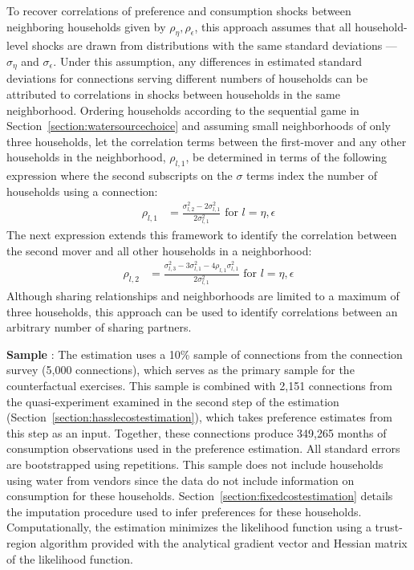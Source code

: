 \documentclass[12pt]{article}
\begin{document}
To recover correlations of preference and consumption shocks between neighboring households given by $\rho_{\eta}, \rho_{\epsilon}$, this approach assumes that all household-level shocks are drawn from distributions with the same standard deviations --- $\sigma_{\eta}$ and $\sigma_{\epsilon}$.  Under this assumption, any differences in estimated standard deviations for connections serving different numbers of households can be attributed to correlations in shocks between households in the same neighborhood.  Ordering households according to the sequential game in Section~\ref{section:watersourcechoice} and assuming small neighborhoods of only three households, let the correlation terms between the first-mover and any other households in the neighborhood, $\rho_{l,1}$, be determined in terms of the following expression where the second subscripts on the $\sigma$ terms index the number of households using a connection:
\begin{align*}
\rho_{l,1} &= \frac{\sigma_{l,2}^2 - 2\sigma_{l,1}^2}{2\sigma_{l,1}^2} \text{ for } l =  \eta, \epsilon 
\end{align*}
The next expression extends this framework to identify the correlation between the second mover and all other households in a neighborhood:
\begin{align*}
\rho_{l,2} &= \frac{\sigma_{l,3}^2 - 3\sigma_{l,1}^2- 4 \rho_{l,1} \sigma_{l,1}^2 }{2\sigma_{l,1}^2 } \text{ for } l =  \eta, \epsilon
\end{align*}
Although sharing relationships and neighborhoods are limited to a maximum of three households, this approach can be used to identify correlations between an arbitrary number of sharing partners.

\textbf{Sample} : The estimation uses a 10\% sample of connections from the connection survey (5,000 connections), which serves as the primary sample for the counterfactual exercises.  This sample is combined with 2,151 connections from the quasi-experiment examined in the second step of the estimation (Section~\ref{section:hasslecostestimation}), which takes preference estimates from this step as an input.  Together, these connections produce 349,265 months of consumption observations used in the preference estimation.  All standard errors are bootstrapped using repetitions.  This sample does not include households using water from vendors since the data do not include information on consumption for these households.  Section~\ref{section:fixedcostestimation} details the imputation procedure used to infer preferences for these households.  Computationally, the estimation minimizes the likelihood function using a trust-region algorithm provided with the analytical gradient vector and Hessian matrix of the likelihood function.
\end{document}

